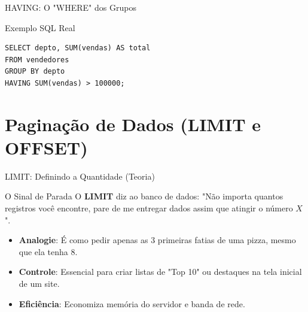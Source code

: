 \documentclass[9pt]{beamer}
\begin{document}
\begin{frame}[fragile]{HAVING: O "WHERE" dos Grupos}
  \centering
  \vspace{0.3cm}
  \begin{exampleblock}{Exemplo SQL Real}
\begin{lstlisting}
SELECT depto, SUM(vendas) AS total
FROM vendedores
GROUP BY depto
HAVING SUM(vendas) > 100000;
\end{lstlisting}
  \end{exampleblock}
\end{frame}

\section{Paginação de Dados (LIMIT e OFFSET)}

\begin{frame}{LIMIT: Definindo a Quantidade (Teoria)}
  \begin{block}{O Sinal de Parada}
    O \textbf{LIMIT} diz ao banco de dados: "Não importa quantos registros você encontre, pare de me entregar dados assim que atingir o número $X$".
  \end{block}
  \vspace{0.4cm}
  \begin{itemize}
    \item \textbf{Analogie}: É como pedir apenas as 3 primeiras fatias de uma pizza, mesmo que ela tenha 8.
    \item \textbf{Controle}: Essencial para criar listas de "Top 10" ou destaques na tela inicial de um site.
    \item \textbf{Eficiência}: Economiza memória do servidor e banda de rede.
  \end{itemize}
\end{frame}
\end{document}
